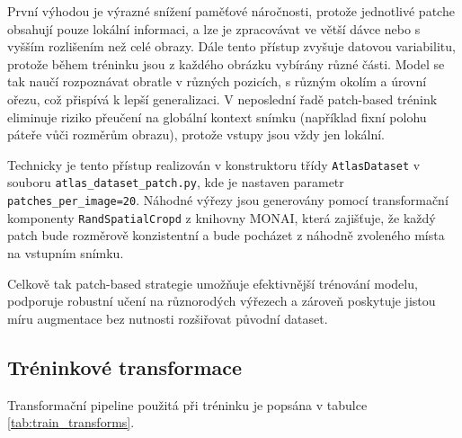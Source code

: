 \documentclass[male,czech,api_bc]{kitheses}
\begin{document}
První výhodou je výrazné snížení paměťové náročnosti, protože jednotlivé patche obsahují pouze lokální informaci, a lze je zpracovávat ve větší dávce nebo s vyšším rozlišením než celé obrazy. Dále tento přístup zvyšuje datovou variabilitu, protože během tréninku jsou z každého obrázku vybírány různé části. Model se tak naučí rozpoznávat obratle v různých pozicích, s různým okolím a úrovní ořezu, což přispívá k lepší generalizaci. V neposlední řadě patch-based trénink eliminuje riziko přeučení na globální kontext snímku (například fixní polohu páteře vůči rozměrům obrazu), protože vstupy jsou vždy jen lokální.

Technicky je tento přístup realizován v konstruktoru třídy \texttt{AtlasDataset} v souboru \texttt{atlas\-\_dataset\-\_patch.py}, kde je nastaven parametr \texttt{patches\_per\_image=20}. Náhodné výřezy jsou generovány pomocí transformační komponenty \texttt{RandSpatialCropd} z knihovny MONAI, která zajišťuje, že každý patch bude rozměrově konzistentní a bude pocházet z náhodně zvoleného místa na vstupním snímku.

Celkově tak patch-based strategie umožňuje efektivnější trénování modelu, podporuje robustní učení na různorodých výřezech a zároveň poskytuje jistou míru augmentace bez nutnosti rozšiřovat původní dataset.

\newpage
\subsection*{Tréninkové transformace}

Transformační pipeline použitá při tréninku je popsána v tabulce \ref{tab:train_transforms}.
\end{document}
